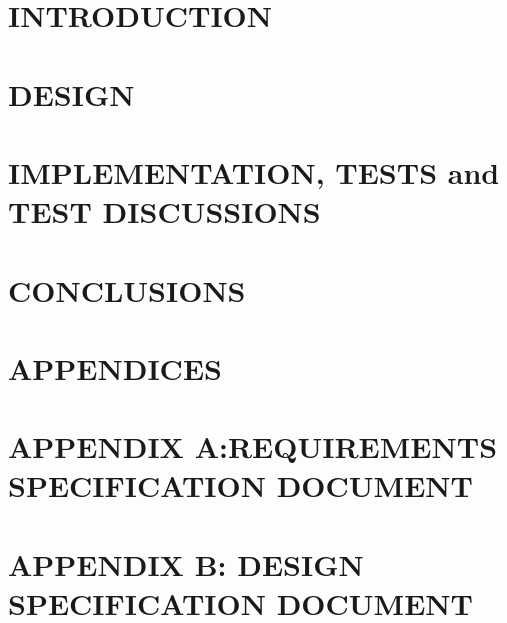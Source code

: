\documentclass[final,12pt,a4paper]{COMP4910}
\begin{document}
	\chapter{INTRODUCTION}\label{ch:Introduction}
	

	\chapter{DESIGN}\label{ch:Design}
	

	\chapter{IMPLEMENTATION, TESTS and TEST DISCUSSIONS}\label{ch:Implementation}
	

	\chapter{CONCLUSIONS}\label{ch:Conclusion}
	

	\cite{*} %
	\backmatter{}
	

	\appendix\chapter{APPENDICES}
	

	\appendix\chapter{APPENDIX A:REQUIREMENTS SPECIFICATION DOCUMENT}
	

	\appendix\chapter{APPENDIX B: DESIGN SPECIFICATION DOCUMENT}
	
\end{document}
